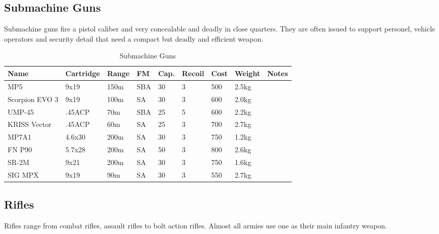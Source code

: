 \subsection{Submachine Guns}

Submachine guns fire a pistol caliber and very concealable and deadly in close
quarters. They are often issued to support personel, vehicle operators and
security detail that need a compact but deadly and efficient weapon.

\begin{table}
  \caption{Submachine Guns}
  \label{tab:SMG}
  \begin{center}
    \begin{tabular}{| l | l | l | l | l | l | l | l | l |}
      \hline
      \textbf{Name} & \textbf{Cartridge} & \textbf{Range} &
      \textbf{FM} & \textbf{Cap.} & \textbf{Recoil} &
      \textbf{Cost} & \textbf{Weight} & \textbf{Notes} \\ \hline

      MP5            & 9x19   & 150m & SBA & 30 & 3 & 500 & 2.5kg & \\ \hline
      Scorpion EVO 3 & 9x19   & 100m & SA  & 30 & 3 & 600 & 2.0kg & \\ \hline

      UMP-45         & .45ACP &  70m & SBA & 25 & 5 & 600 & 2.2kg & \\ \hline
      KRISS Vector   & .45ACP &  60m & SA  & 25 & 3 & 700 & 2.7kg & \\ \hline

      MP7A1          & 4.6x30 & 200m & SA  & 30 & 3 & 750 & 1.2kg & \\ \hline
      FN P90         & 5.7x28 & 200m & SA  & 50 & 3 & 800 & 2.6kg & \\ \hline
      SR-2M          & 9x21   & 200m & SA  & 30 & 3 & 750 & 1.6kg & \\ \hline
      SIG MPX        & 9x19   &  90m & SA  & 30 & 3 & 550 & 2.7kg & \\ \hline

    \end{tabular}
  \end{center}
\end{table}

\subsection{Rifles}

Rifles range from combat rifles, assault rifles to bolt action rifles. Almost
all armies use one as their main infantry weapon.

